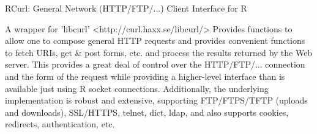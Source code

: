 RCurl: General Network (HTTP/FTP/...) Client Interface for R

A wrapper for 'libcurl' <http://curl.haxx.se/libcurl/> Provides functions to allow one to compose general HTTP requests and provides convenient functions to fetch URIs, get & post forms, etc. and process the results returned by the Web server. This provides a great deal of control over the HTTP/FTP/... connection and the form of the request while providing a higher-level interface than is available just using R socket connections. Additionally, the underlying implementation is robust and extensive, supporting FTP/FTPS/TFTP (uploads and downloads), SSL/HTTPS, telnet, dict, ldap, and also supports cookies, redirects, authentication, etc.
